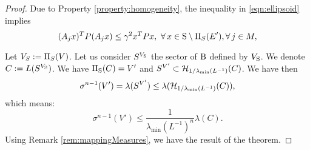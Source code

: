 \begin{proof} 



Due to Property \ref{property:homogeneity}, the inequality in \eqref{eqn:ellipsoid} implies
\begin{equation}(A_j x)^TP(A_j x) \leq \gamma^2x^TPx,\,\, \forall\, x \in \text{S} \setminus \Pi_S(E'), \forall\, j \in M, \end{equation}



Let $V_S:=\Pi_S(V)$. Let us consider $S^{V_{\text{S}}}$ the sector of $\text{B}$ defined by $V_{\text{S}}$. We denote $C:= L(S^{V_{\text{S}}})$. We have $\Pi_{\text{S}}(C) = V'$ and $S^{V'} \subset \mathcal{H}_{1/ \lambda_{\min}(L^{-1})}(C)$.  We have then 
$$\sigma^{n-1}(V') = \lambda(S^{V'}) \leq \lambda (\mathcal{H}_{1/ \lambda_{\min}(L^{-1})}(C)),$$ which means: $$\sigma^{n-1}(V') \leq \frac{1}{\lambda_{\min}(L^{-1})^n} \lambda(C).$$ Using Remark \ref{rem:mappingMeasures}, we have the result of the theorem.
\end{proof}

